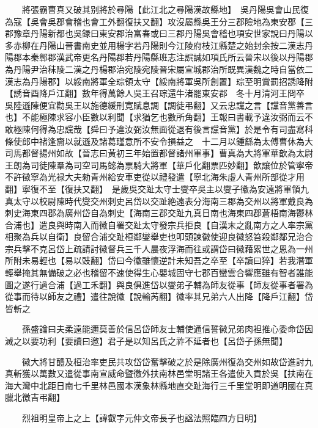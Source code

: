 　　將張霸曹真又破其别將於尋陽【此江北之尋陽漢故縣地】　吳丹陽吳會山民復為寇【吳會吳郡會稽也會工外翻復扶又翻】攻沒屬縣吳王分三郡險地為東安郡【三郡豫章丹陽新都也吳録曰東安郡治富春或曰三郡丹陽吳會稽也項安世家說曰丹陽以多赤柳在丹陽山晉書南史並用楊字若丹陽則今江陵府枝江縣楚之始封余按二漢志丹陽郡本秦鄣郡漢武帝更名丹陽郡若丹陽縣班志注誤誠如項氏所云晉宋以後以丹陽郡為丹陽尹治秣陵二漢之丹楊郡治宛陵宛陵晉宋屬宣城郡治所既異漢魏之時自當依二漢志為丹陽郡】以綏南將軍全琮領太守【綏南將軍吳所創置】琮至明賞罰招誘降附【誘音酉降戶江翻】數年得萬餘人吳王召琮還牛渚罷東安郡　冬十月清河王冏卒　吳陸遜陳便宜勸吳王以施德緩刑寛賦息調【調徒弔翻】又云忠讜之言【讜音黨善言也】不能極陳求容小臣數以利聞【求猶乞也數所角翻】王報曰書載予違汝弼而云不敢極陳何得為忠讜哉【舜曰予違汝弼汝無面從退有後言讜音黨】於是令有司盡寫科條使郎中禇逢齎以就遜及諸葛瑾意所不安令損益之　十二月以鍾繇為太傅曹休為大司馬都督揚州如故【晉志曰黃初三年始置都督諸州軍事】曹真為大將軍華歆為太尉王朗為司徒陳羣為司空司馬懿為票騎大將軍【華戶化翻票匹妙翻】歆讓位於管寧帝不許徵寧為光禄大夫勑青州給安車吏從以禮發遣【寧北海朱虛人青州所部從才用翻】寧復不至【復扶又翻】　是歲吳交趾太守士燮卒吳主以燮子徽為安遠將軍領九真太守以校尉陳時代燮交州刺史呂岱以交趾絶遠表分海南三郡為交州以將軍戴良為刺史海東四郡為廣州岱自為刺史【海南三郡交趾九真日南也海東四郡蒼梧南海鬱林合浦也】遣良與時南入而徽自署交趾太守發宗兵拒良【自漢末之亂南方之人率宗黨相聚為兵以自衛】良留合浦交趾桓鄰燮舉吏也叩頭諫徽使迎良徽怒笞殺鄰鄰兄治合宗兵擊不克呂岱上疏請討徽督兵三千人晨夜浮海而往或謂岱曰徽藉累世之恩為一州所附未易輕也【易以豉翻】岱曰今徽雖懷逆計未知吾之卒至【卒讀曰猝】若我潛軍輕舉掩其無備破之必也稽留不速使得生心嬰城固守七郡百蠻雲合響應雖有智者誰能圖之遂行過合浦【過工禾翻】與良俱進岱以燮弟子輔為師友從事【師友從事者署為從事而待以師友之禮】遣往說徽【說輸芮翻】徽率其兄弟六人出降【降戶江翻】岱皆斬之

　　孫盛論曰夫柔遠能邇莫善於信呂岱師友士輔使通信誓徽兄弟肉袒推心委命岱因滅之以要功利【要讀曰邀】君子是以知呂氏之祚不延者也【呂岱子孫無聞】

　　徽大將甘醴及桓治率吏民共攻岱岱奮擊破之於是除廣州復為交州如故岱進討九真斬獲以萬數又遣從事南宣威命暨徼外扶南林邑堂明諸王各遣使入貢於吳【扶南在海大灣中北距日南七千里林邑國本漢象林縣地直交趾海行三千里堂明即道明國在真臘北徼吉弔翻】

　　烈祖明皇帝上之上【諱叡字元仲文帝長子也諡法照臨四方日明】

